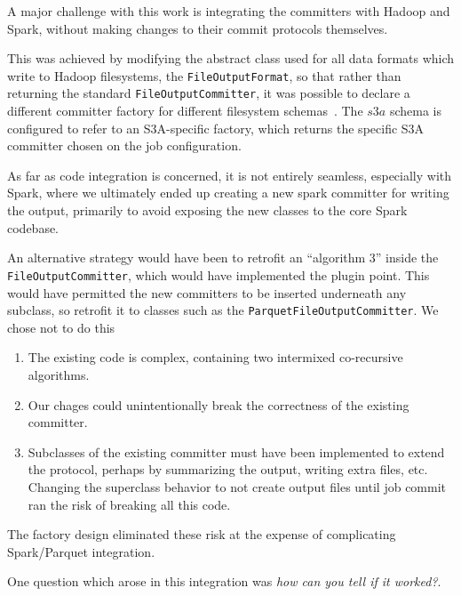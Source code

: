 \documentclass[conference]{IEEEtran}
\begin{document}
A major challenge with this work is integrating the committers with Hadoop
and Spark, without making changes to their commit protocols themselves.

This was achieved by modifying the abstract class used for all data formats
which write to Hadoop filesystems, the \texttt{FileOutputFormat}, so that rather than
returning the standard \texttt{FileOutputCommitter}, it was possible to declare
a different committer factory for different filesystem schemas\ \cite{MAPREDUCE-6823}.
The $s3a$ schema is configured to refer to an S3A-specific factory, which
returns the specific S3A committer chosen on the job configuration.


As far as code integration is concerned, it is not entirely seamless, especially
with Spark, where we ultimately ended up creating a new spark committer for
writing the output, primarily to avoid exposing the new classes to the core
Spark codebase.

An alternative strategy would have been to retrofit an ``algorithm 3'' inside
the \texttt{FileOutputCommitter}, which would have implemented the plugin point.
This would have permitted the new committers to be inserted underneath any
subclass, so retrofit it to classes such as the \texttt{ParquetFileOutputCommitter}.
We chose not to do this

\begin{enumerate}
  \item The existing code is complex, containing two intermixed co-recursive
  algorithms.
  \item Our chages could unintentionally break the correctness of the existing committer.
  \item Subclasses of the existing committer must have been implemented to extend
  the protocol, perhaps by summarizing the output, writing extra files, etc.
  Changing the superclass behavior to not create output files until job commit
  ran the risk of breaking all this code.
\end{enumerate}

The factory design eliminated these risk at the expense of complicating
Spark/Parquet integration.


One question which arose in this integration was \emph{how can you tell if it worked?}.
\end{document}
